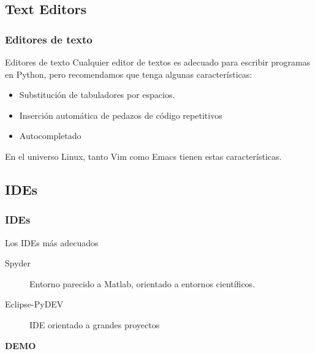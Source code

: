 \documentclass[10pt,colorlinks]{beamer}
\begin{document}
\subsection{Text Editors} %
\begin{frame}[fragile]\frametitle{Editores de texto}
\begin{block}{Editores de texto}
 Cualquier editor de textos es adecuado para escribir programas en Python, pero recomendamos que tenga algunas características:
\begin{itemize}
    \item Substitución de tabuladores por espacios.
    \item Inserción automática de pedazos de código repetitivos
    \item Autocompletado
\end{itemize}
En el universo Linux, tanto Vim como Emacs tienen estas características.
\end{block}

\end{frame}

\subsection{IDEs}
\begin{frame}[fragile]\frametitle{IDEs}
 \begin{block}{Los IDEs más adecuados}
 \begin{description}
     \item[Spyder] Entorno parecido a Matlab, orientado a entornos científicos.
     \item[Eclipse-PyDEV] IDE orientado a grandes proyectos  
 \end{description}
 \end{block}
\begin{center}
    \textbf{DEMO}
\end{center}

\end{frame}










\end{document}
